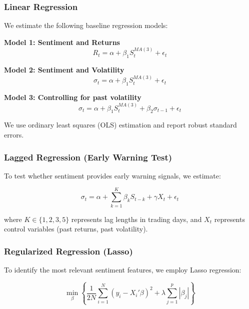 \documentclass[12pt,a4paper]{article}
\begin{document}
\subsubsection{Linear Regression}
\label{subsubsec:linear-reg}

We estimate the following baseline regression models:

\textbf{Model 1: Sentiment and Returns}
\begin{equation}
    R_t = \alpha + \beta_1 S_t^{MA(3)} + \epsilon_t
    \label{eq:model1}
\end{equation}

\textbf{Model 2: Sentiment and Volatility}
\begin{equation}
    \sigma_t = \alpha + \beta_1 S_t^{MA(3)} + \epsilon_t
    \label{eq:model2}
\end{equation}

\textbf{Model 3: Controlling for past volatility}
\begin{equation}
    \sigma_t = \alpha + \beta_1 S_t^{MA(3)} + \beta_2 \sigma_{t-1} + \epsilon_t
    \label{eq:model3}
\end{equation}

We use ordinary least squares (OLS) estimation and report robust standard errors.

\subsubsection{Lagged Regression (Early Warning Test)}
\label{subsubsec:lagged-reg}

To test whether sentiment provides early warning signals, we estimate:

\begin{equation}
    \sigma_t = \alpha + \sum_{k=1}^{K} \beta_k S_{t-k} + \gamma X_t + \epsilon_t
    \label{eq:lagged}
\end{equation}

where $K \in \{1, 2, 3, 5\}$ represents lag lengths in trading days, and $X_t$ represents control variables (past returns, past volatility).

\subsubsection{Regularized Regression (Lasso)}
\label{subsubsec:lasso}

To identify the most relevant sentiment features, we employ Lasso regression:

\begin{equation}
    \min_{\beta} \left\{ \frac{1}{2N} \sum_{i=1}^{N} (y_i - X_i'\beta)^2 + \lambda \sum_{j=1}^{p} |\beta_j| \right\}
    \label{eq:lasso}
\end{equation}
\end{document}
